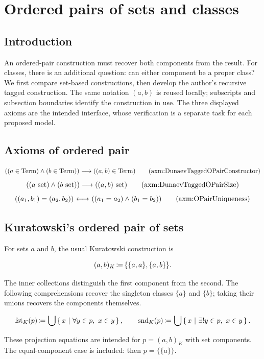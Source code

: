 \def\topic{Ordered pair}

\section{Ordered pairs of sets and classes}
\label{sec:ordered_pairs_foundations}
\subsection{Introduction}
An ordered-pair construction must recover both components from the result.
For classes, there is an additional question: can either component be a
proper class? We first compare set-based constructions, then develop the
author's recursive tagged construction. The same notation $(a,b)$ is reused
locally; subscripts and subsection boundaries identify the construction in use.
The three displayed axioms are the intended interface, whose verification
is a separate task for each proposed model.
\subsection{Axioms of ordered pair}
\[
((a\in\Term)\land(b\in\Term))\implies((a,b)\in\Term)
\clabeltagd{axm}{DunaevTaggedOPairConstructor}
\]
\[
((a\set)\land(b\set))\implies((a,b)\set)
\clabeltagd{axm}{DunaevTaggedOPairSize}
\]%
\[
((a_1,b_1)=(a_2,b_2))
\iff
(
(a_1=a_2)
\land
(b_1=b_2)
)
\clabeltagd{axm}{OPairUniqueness}
\]
\subsection{Kuratowski's ordered pair of sets}
For sets $a$ and $b$, the usual Kuratowski construction is
\begin{definition}
\[
(a,b)_K\,{\coloneqq}\, \{\{a,a\},\{a,b\}\}.
\]
\end{definition}
The inner collections distinguish the first component from the second.
The following comprehensions recover the singleton classes $\{a\}$ and
$\{b\}$; taking their unions recovers the components themselves.
\begin{definition}
\[
\mathrm{fst}_K(p)\,{\coloneqq}\, \bigcup\left\{\,x\ \middle|\ \forall y\in p,\ x\in y\,\right\},
\qquad
\mathrm{snd}_K(p)\,{\coloneqq}\, \bigcup\left\{\,x\ \middle|\ \exists! y\in p,\ x\in y\,\right\}.
\]
\end{definition}
These projection equations are intended for $p=(a,b)_K$ with set
components. The equal-component case is included: then $p=\{\{a\}\}$.

